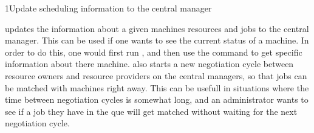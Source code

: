 \begin{ManPage}{}{1}{Update scheduling information to the
central manager}
\label{man-condor-reschedule}
\Synopsis {}

\Description 

 updates the information about a given machines resources
and jobs to the central manager.  This can be used if one wants to see the
current status of a machine.  In order to do this, one would first run
, and then use the  command to get 
specific information about there machine.   also
starts a new negotiation cycle between resource owners and resource providers
on the central managers, so that jobs can be matched with machines right
away.  This can be usefull in situations where the time between negotiation
cycles is somewhat long, and an administrator wants to see if a job they have
in the que will get matched without waiting for the next negotiation cycle.

\begin{Options}
\end{Options}

\end{ManPage}
